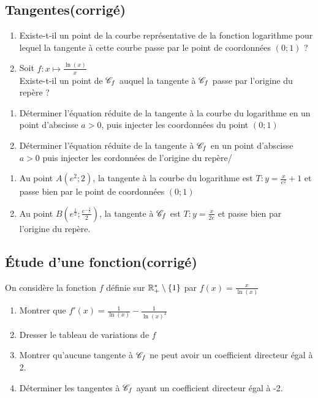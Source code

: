 \documentclass[oneside,12pt]{book}          %
\begin{document}
\subsection{Tangentes\quad\small{(corrigé)}}
\begin{enumerate}
    \item Existe-t-il un point de la courbe représentative de la fonction logarithme pour lequel la tangente à cette courbe passe par le point de coordonnées $(0;1)$ ?
    \item Soit $f:x\mapsto\frac{\ln(x)}{x}$\\
    Existe-t-il un point de ${\mathscr{C}}_f$ auquel la tangente à ${\mathscr{C}}_f$ passe par l'origine du repère ?
\end{enumerate}

\begin{hint}
	\begin{enumerate}
		\item Déterminer l'équation réduite de la tangente à la courbe du logarithme en un point d'abscisse $a>0$, puis injecter les coordonnées du point $(0;1)$
		\item Déterminer l'équation réduite de la tangente à ${\mathscr{C}}_f$ en un point d'abscisse $a>0$ puis injecter les cordonnées de l'origine du repère/
	\end{enumerate}
\end{hint}
\begin{sol}
	\begin{enumerate}
		\item Au point $A\left(e^2;2\right)$, la tangente à la courbe du logarithme est $T:y=\frac{x}{e^2}+1$ et passe bien par le point de coordonnées $(0;1)$
		\item Au point $B\left(e^{\frac{1}{2}};\frac{e^{-\frac{1}{2}}}{2}\right)$, la tangente à ${\mathscr{C}}_f$ est $T:y=\frac{x}{2e}$ et passe bien par l'origine du repère.
	\end{enumerate}
\end{sol}



\subsection{Étude d'une fonction\quad\small{(corrigé)}}
On considère la fonction $f$ définie sur ${\mathbb R}_+^*\setminus\{1\}$ par $f(x)=\frac{x}{\ln(x)}$
\begin{enumerate}
    \item Montrer que $f'(x)=\frac{1}{\ln(x)}-\frac{1}{\ln(x)^2}$
    \item Dresser le tableau de variations de $f$
    \item Montrer qu'aucune tangente à ${\mathscr{C}}_f$ ne peut avoir un coefficient directeur égal à 2.
    \item Déterminer les tangentes à ${\mathscr{C}}_f$ ayant un coefficient directeur égal à -2.
\end{enumerate}
\end{document}

